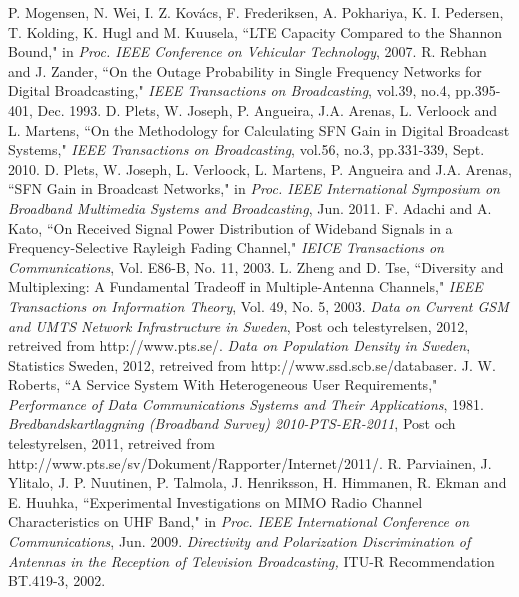 \documentclass[journal]{IEEEtran}
\begin{document}
\begin{thebibliography}{40}
 P. Mogensen, N. Wei, I. Z. Kov\'{a}cs, F. Frederiksen, A. Pokhariya, K. I. Pedersen, T. Kolding, K. Hugl and M. Kuusela, ``LTE Capacity Compared to the Shannon Bound," in \emph{Proc. IEEE Conference on Vehicular Technology}, 2007.
    R. Rebhan and J. Zander, ``On the Outage Probability in Single Frequency Networks for Digital Broadcasting," \emph{IEEE Transactions on Broadcasting}, vol.39, no.4, pp.395-401, Dec. 1993.
    D. Plets,  W. Joseph, P. Angueira, J.A. Arenas, L. Verloock and L. Martens, ``On the Methodology for Calculating SFN Gain in Digital Broadcast Systems," \emph{IEEE Transactions on Broadcasting}, vol.56, no.3, pp.331-339, Sept. 2010.
 D. Plets,  W. Joseph, L. Verloock, L. Martens, P. Angueira and J.A. Arenas, ``SFN Gain in Broadcast Networks," in \emph{Proc. IEEE International Symposium on Broadband Multimedia Systems and Broadcasting}, Jun. 2011.
 F. Adachi and A. Kato, ``On Received Signal Power Distribution of Wideband Signals in a Frequency-Selective Rayleigh Fading Channel," \emph{IEICE Transactions on Communications}, Vol. E86-B, No. 11, 2003.
 L. Zheng and D. Tse, ``Diversity and Multiplexing: A Fundamental Tradeoff in Multiple-Antenna Channels," \emph{IEEE Transactions on Information Theory}, Vol. 49, No. 5, 2003.
  \emph{Data on Current GSM and UMTS Network Infrastructure in Sweden}, Post och telestyrelsen, 2012, retreived from http://www.pts.se/.
 \emph{Data on Population Density in Sweden}, Statistics Sweden, 2012, retreived from http://www.ssd.scb.se/databaser.
 J. W. Roberts, ``A Service System With Heterogeneous User Requirements," \emph{Performance of Data Communications Systems and Their Applications}, 1981.
 \emph{Bredbandskartlaggning (Broadband Survey) 2010-PTS-ER-2011}, Post och telestyrelsen, 2011,  retreived from http://www.pts.se/sv/Dokument/Rapporter/Internet/2011/.
  R. Parviainen, J. Ylitalo, J. P. Nuutinen, P. Talmola, J. Henriksson, H. Himmanen, R. Ekman and E. Huuhka, ``Experimental Investigations on MIMO Radio Channel Characteristics on UHF Band," in \emph{Proc. IEEE International Conference on Communications}, Jun. 2009.
 \emph{Directivity and Polarization Discrimination of Antennas in the Reception of Television Broadcasting,} ITU-R Recommendation BT.419-3, 2002.

\end{thebibliography}
\end{document}
